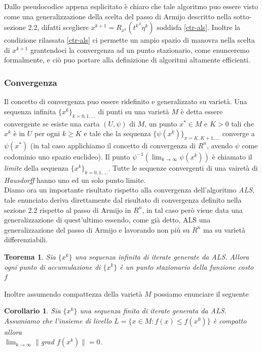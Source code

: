\documentclass[a4paper, 12pt]{article}
\newtheorem{theorem}{Teorema}
\newtheorem{corollary}{Corollario}
\begin{document}
Dallo pseudocodice appena esplicitato è chiaro che tale algoritmo puo essere visto come una generalizzazione della scelta del passo di Armijo descritto nella sotto-sezione 2.2, difatti scegliere $x^{k+1} = R_{x^k}(t^{k^A}\eta^k)$ soddisfa \eqref{ctr-als}. Inoltre la condizione rilassata \eqref{ctr-als} ci permette un ampio spazio di manovra nella scelta di $x^{k+1}$ grantendoci la convergenza ad un punto stazionario, come enunceremo formalmente, e ciò puo portare alla definizione di algoritmi altamente efficienti.

\subsubsection{Convergenza}
Il concetto di convergenza puo essere ridefinito e generalizzato su varietà. Una sequenza infinita $\{x^k\}_{k=0,1,...}$ di punti su una varietà $M$ è detta essere convergente se esiste una carta $(U, \psi)$ di $M$, un punto $x^\ast \in M$ e $K > 0$ tali che $x^k$ è in $U$ per ogni $k \geq K$ e tale che la sequenza $\{\psi(x^k)\}_{x=K, K+1, ...}$ converge a $\psi(x^\ast)$ (in tal caso applichiamo il concetto di convergenza di $R^n$, avendo $\psi$ come codominio uno spazio euclideo). Il punto $\psi^{-1}(\lim_{k \to \infty} \psi(x^k))$ è chiamato il \emph{limite} della sequenza $\{x^k\}_{k=0,1,...}$. Tutte le sequenze convergenti di una vairetà di \emph{Hausdorff} hanno uno ed un solo punto limite.\\
Diamo ora un importante risultato rispetto alla convergenza dell'algoritmo \emph{ALS}, tale enunciato deriva direttamente dal risultato di convergenza definito nella sezione 2.2 rispetto al passo di Armijo in $R^n$, in tal caso però viene data una generalizzazione di quest'ultimo essendo, come già detto, ALS una generalizzazione del passo di Armijo e lavorando non più su $R^n$ ma su varietà differenziabili.
\begin{theorem}
Sia $\{x^k\}$ una sequenza infinita di iterate generate da ALS. Allora ogni punto di accumulazione  di $\{x^k\}$ è un punto stazionario della funzione costo $f$
\end{theorem}
Inoltre assumendo compattezza della varietà $M$ possiamo enunciare il seguente
\begin{corollary}
Sia $\{x^k\}$ una sequenza finita di iterate generata da ALS. Assumiamo che l'insieme di livello $L = \{x \in M : f(x) \leq f(x^0)\}$ è compatto allora\\ $\lim_{k \to \infty} \parallel $grad $f(x^k) \parallel = 0$.
\end{corollary}
\end{document}

